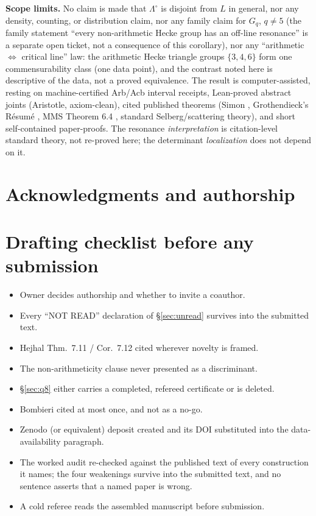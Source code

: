 \documentclass[11pt]{amsart}
\theoremstyle{remark}
\begin{document}
\textbf{Scope limits.} No claim is made that $\Lambda^\circ$ is disjoint
from $L$ in general, nor any density, counting, or distribution claim,
nor any family claim for $G_q$, $q\neq5$ (the family statement ``every
non-arithmetic Hecke group has an off-line resonance'' is a separate open
ticket, not a consequence of this corollary), nor any ``arithmetic
$\iff$ critical line'' law: the arithmetic Hecke triangle groups
$\{3,4,6\}$ form one commensurability class (one data point), and the
contrast noted here is descriptive of the data, not a proved equivalence.
The result is computer-assisted, resting on machine-certified Arb/Acb
interval receipts, Lean-proved abstract joints (Aristotle, axiom-clean),
cited published theorems (Simon \cite{Simon1977}, Grothendieck's
R\'esum\'e \cite{GrothendieckResume}, MMS Theorem 6.4 \cite{MMS2012}, standard
Selberg/scattering theory), and short self-contained paper-proofs. The
resonance \emph{interpretation} is citation-level standard theory, not
re-proved here; the determinant \emph{localization} does not depend on
it.

\section{Acknowledgments and authorship}


\section*{Drafting checklist before any submission}

\begin{itemize}
\item[$\square$] Owner decides authorship and whether to invite a coauthor.
\item[$\square$] Every ``NOT READ'' declaration of \S\ref{sec:unread} survives into the submitted text.
\item[$\square$] Hejhal Thm.\ 7.11 / Cor.\ 7.12 cited wherever novelty is framed.
\item[$\square$] The non-arithmeticity clause never presented as a discriminant.
\item[$\square$] \S\ref{sec:q8} either carries a completed, refereed certificate or is deleted.
\item[$\square$] Bombieri cited at most once, and not as a no-go.
\item[$\square$] Zenodo (or equivalent) deposit created and its DOI substituted into the data-availability paragraph.
\item[$\square$] The worked audit re-checked against the published text of every construction it names; the four weakenings survive into the submitted text, and no sentence asserts that a named paper is wrong.
\item[$\square$] A cold referee reads the assembled manuscript before submission.
\end{itemize}
\end{document}
